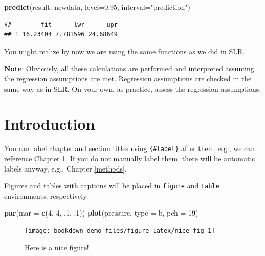 \documentclass[
]{book}
\newenvironment{Shaded}{\begin{snugshade}}{\end{snugshade}}
\newcommand{\AttributeTok}[1]{\textcolor[rgb]{0.13,0.29,0.53}{#1}}
\newcommand{\DecValTok}[1]{\textcolor[rgb]{0.00,0.00,0.81}{#1}}
\newcommand{\FloatTok}[1]{\textcolor[rgb]{0.00,0.00,0.81}{#1}}
\newcommand{\FunctionTok}[1]{\textcolor[rgb]{0.13,0.29,0.53}{\textbf{#1}}}
\newcommand{\NormalTok}[1]{#1}
\newcommand{\StringTok}[1]{\textcolor[rgb]{0.31,0.60,0.02}{#1}}
\begin{document}
\begin{Shaded}
\begin{Highlighting}[]
\FunctionTok{predict}\NormalTok{(result, newdata, }\AttributeTok{level=}\FloatTok{0.95}\NormalTok{,}
        \AttributeTok{interval=}\StringTok{"prediction"}\NormalTok{)}
\end{Highlighting}
\end{Shaded}

\begin{verbatim}
##        fit      lwr      upr
## 1 16.23404 7.781596 24.68649
\end{verbatim}

You might realize by now we are using the same functions as we did in SLR.

\textbf{Note}: Obviously, all these calculations are performed and interpreted assuming the regression assumptions are met. Regression assumptions are checked in the same way as in SLR. On your own, as practice, assess the regression assumptions.

\hypertarget{intro}{%
\chapter{Introduction}\label{intro}}

You can label chapter and section titles using \texttt{\{\#label\}} after them, e.g., we can reference Chapter \ref{intro}. If you do not manually label them, there will be automatic labels anyway, e.g., Chapter \ref{methods}.

Figures and tables with captions will be placed in \texttt{figure} and \texttt{table} environments, respectively.

\begin{Shaded}
\begin{Highlighting}[]
\FunctionTok{par}\NormalTok{(}\AttributeTok{mar =} \FunctionTok{c}\NormalTok{(}\DecValTok{4}\NormalTok{, }\DecValTok{4}\NormalTok{, .}\DecValTok{1}\NormalTok{, .}\DecValTok{1}\NormalTok{))}
\FunctionTok{plot}\NormalTok{(pressure, }\AttributeTok{type =} \StringTok{\textquotesingle{}b\textquotesingle{}}\NormalTok{, }\AttributeTok{pch =} \DecValTok{19}\NormalTok{)}
\end{Highlighting}
\end{Shaded}

\begin{figure}

{\centering \texttt{[image: bookdown-demo\_files/figure-latex/nice-fig-1]} 

}

\caption{Here is a nice figure!}\label{fig:nice-fig}
\end{figure}
\end{document}
